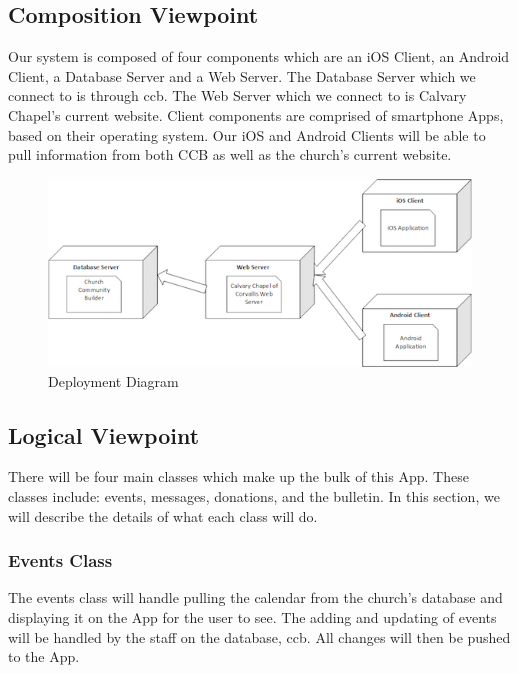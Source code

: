 \documentclass[letterpaper,10pt,draftclsnofoot,onecolumn,titlepage]{IEEEtran}
\begin{document}
		\subsection{Composition Viewpoint}
			Our system is composed of four components which are an \gls{iOS} Client, an \gls{Android} Client, a Database Server and a Web Server.
			The Database Server which we connect to is through \gls{ccb}.
			The Web Server which we connect to is Calvary Chapel's current website.
			Client components are comprised of smartphone \glspl{App}, based on their operating system.
			Our \gls{iOS} and \gls{Android} Clients will be able to pull information from both CCB as well as the church's current website.

		\begin{figure}[H]
			\centering
			\includegraphics[natwidth=552, natheight=245]{Deployment.png}
			\caption{Deployment Diagram}
			\label{fig:deployment}
		\end{figure}

		\subsection{Logical Viewpoint}
			There will be four main classes which make up the bulk of this \gls{App}.
			These classes include: events, messages, donations, and the bulletin.
			In this section, we will describe the details of what each class will do.

			\subsubsection{Events Class}
				The events class will handle pulling the calendar from the church's database and displaying it on the \gls{App} for the user to see.
				The adding and updating of events will be handled by the staff on the database, \gls{ccb}.
				All changes will then be pushed to the \gls{App}.
\end{document}
